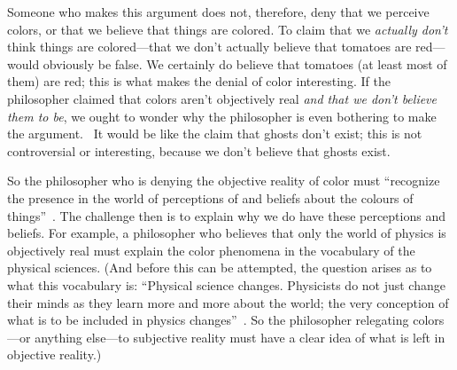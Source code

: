 \documentclass[11pt]{standalone}
\begin{document}
\begin{spacing}{1.5}
Someone who makes this argument does not, therefore, deny that we
perceive colors, or that we believe that things are colored.  To claim
that we {\em actually don't} think things are colored---that we don't
actually believe that tomatoes are red---would obviously be false.  We
certainly do believe that tomatoes (at least most of them) are red;
this is what makes the denial of color interesting.  If the
philosopher claimed that colors aren't objectively real {\em and that
  we don't believe them to be}, we ought to wonder why the philosopher
is even bothering to make the argument.
%
%
\ It would be like the claim that ghosts don't exist; this is not
controversial or interesting, because we don't believe that ghosts
exist.

So the philosopher who is denying the objective reality of color must
``recognize the presence in the world of perceptions of and beliefs
about the colours of things''~\citep[199]{stroud2000a}.  The challenge
then is to explain why we do have these perceptions and beliefs.  For
example, a philosopher who believes that only the world of physics is
objectively real must explain the color phenomena in the vocabulary of
the physical sciences.  (And before this can be attempted, the
question arises as to what this vocabulary is: ``Physical science
changes.  Physicists do not just change their minds as they learn more
and more about the world; the very conception of what is to be
included in physics changes''~\citep[53]{stroud2000a}.  So the
philosopher relegating colors---or anything else---to subjective
reality must have a clear idea of what is left in objective reality.)


\end{spacing}
\end{document}
